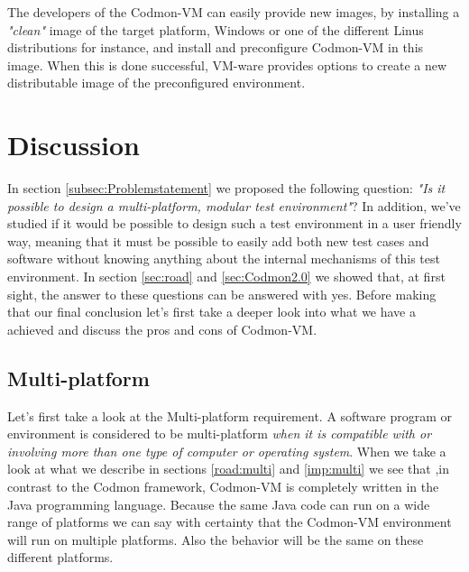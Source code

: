 \documentclass{article}
\newcommand{\project}{Codmon-VM}
\begin{document}
\noindent The developers of the \project{} can easily provide new images, by installing a \emph{"clean"} image of the target platform, Windows or one of the different Linus distributions for instance, and 
install and preconfigure \project{} in this image. When this is done successful, VM-ware provides options to create a new distributable image of the preconfigured environment. 

\newpage
\section{Discussion}
\label{sec:evaluation}
In section \ref{subsec:Problemstatement} we proposed the following question: \emph{"Is it possible to design a multi-platform, modular test environment"}? In addition, we've studied if it would be 
possible to design such a test environment in a user friendly way, meaning that it must be possible to easily add both new test cases and software without knowing anything about the internal mechanisms of this test environment. 
In section \ref{sec:road} and \ref{sec:Codmon2.0} we showed that, at first sight, the answer to these questions can be answered with yes. Before making that our final conclusion let's first take a deeper look 
into what we have a achieved and discuss the pros and cons of \project{}. \\

\subsection{Multi-platform}
\label{dis:multi}
Let's first take a look at the Multi-platform requirement. A software program or environment is considered to be multi-platform \emph{when it is compatible with or involving more than one type of computer or 
operating system}\cite{def:multi}. When we take a look at what we describe in sections \ref{road:multi} and \ref{imp:multi} we see that ,in contrast to the Codmon framework, \project{} is completely written in 
the Java programming language. Because the same Java code can run on a wide range of platforms we can say with certainty that the \project{} environment will run on multiple platforms. Also the behavior will be 
the same on these different platforms\cite{Java}. 
\end{document}
